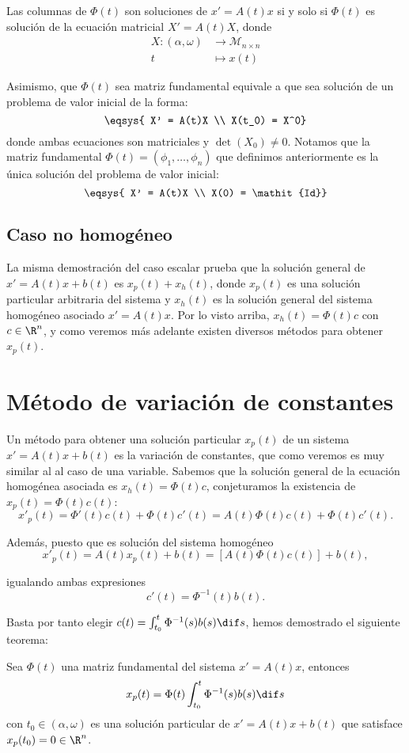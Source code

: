 \documentclass[../ecuaciones_diferenciales.tex]{subfiles}
\begin{document}
Las columnas de \(\Phi(t)\) son soluciones de \(x' = A(t)x\) si y solo si
\(\Phi(t)\) es solución de la ecuación matricial \(X' = A(t)X\), donde
\begin{align*}
	X : (\alpha, \omega) & \to \mathcal{M}_{n \times n} \\
	t                    & \mapsto x(t)
\end{align*}

Asimismo, que \(\Phi(t)\) sea matriz fundamental equivale a que sea solución de
un problema de valor inicial de la forma:
\[\eqsys{
		X' = A(t)X \\
		X(t_0) = X^0}\]
donde ambas ecuaciones son matriciales y \(\det(X_0) \neq 0\). Notamos que la
matriz fundamental \(\Phi(t) = (\phi_1, \dots, \phi_n)\) que definimos
anteriormente es la única solución del problema de valor inicial:
\[\eqsys{
		X' = A(t)X \\
		X(0) = \mathit{Id}}\]

\subsection{Caso no homogéneo}

La misma demostración del caso escalar prueba que la solución general de
\(x' = A(t)x + b(t)\) es \(x_p(t) + x_h(t)\), donde \(x_p(t)\) es una solución
particular arbitraria del sistema y \(x_h(t)\) es la solución general del
sistema homogéneo asociado \(x' = A(t)x\). Por lo visto arriba,
\(x_h(t) = \Phi(t)c\) con \(c \in \R^n\), y como veremos más adelante existen
diversos métodos para obtener \(x_p(t)\).

\section{Método de variación de constantes}

Un método para obtener una solución particular \(x_p(t)\) de un sistema
\(x' = A(t)x + b(t)\) es la variación de constantes, que como veremos es muy
similar al al caso de una variable. Sabemos que la solución general de la
ecuación homogénea asociada es \(x_h(t) = \Phi(t)c\), conjeturamos la existencia
de \(x_p(t) = \Phi(t) c(t)\):
\[x'_p(t) = \Phi'(t) c(t) + \Phi(t) c'(t) = A(t )\Phi(t) c(t) + \Phi(t) c'(t).\]

Además, puesto que es solución del sistema homogéneo
\[x'_p(t) = A(t)x_p(t) + b(t) = [A(t) \Phi(t) c(t)] + b(t),\]

igualando ambas expresiones
\[c'(t) = \Phi^{-1}(t) b(t).\]

Basta por tanto elegir \(c(t) = \int_{t_0}^t \Phi^{-1}(s) b(s) \dif s\), hemos
demostrado el siguiente teorema:

\begin{theorem}
	Sea \(\Phi(t)\) una matriz fundamental del sistema \(x' = A(t)x\), entonces
	\[x_p(t) = \Phi(t) \int_{t_0}^t \Phi^{-1}(s) b(s) \dif s\]
	con \(t_0 \in (\alpha, \omega)\) es una solución particular de
	\(x' = A(t)x + b(t)\) que satisface \(x_p(t_0) = 0 \in \R^n\).
\end{theorem}
\end{document}
